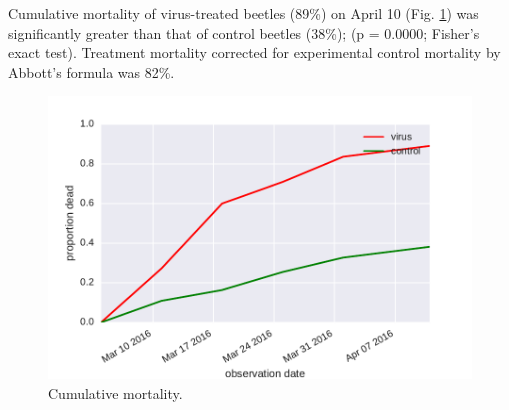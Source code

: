 \documentclass[letterpaper,11pt]{scrartcl}
\begin{document}
Cumulative mortality of virus-treated beetles (89\%) on April 10 (Fig. \ref{mortality}) was significantly 
greater than that of 
control beetles (38\%); (p = 0.0000; Fisher's exact test). 
Treatment mortality corrected for experimental control mortality by Abbott's 
formula was 82\%.

 
\begin{figure}
\centering
\includegraphics[width = \textwidth]{wb3_mortality.pdf}
\caption{Cumulative mortality.}
\label{mortality}
\end{figure} 
 
 
%
%
\end{document}
